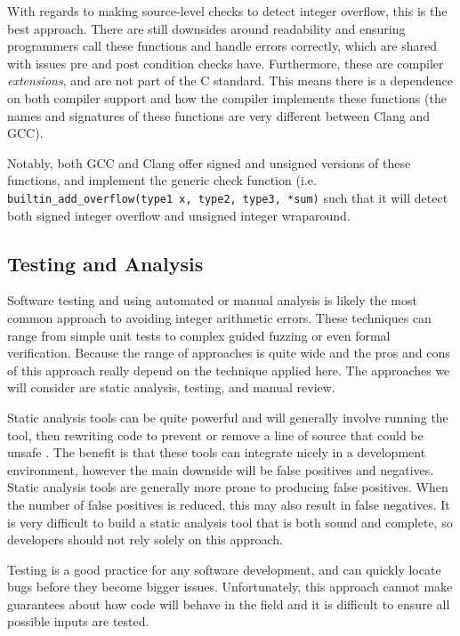 With regards to making source-level checks to detect integer overflow, this is the best approach. There are still downsides around readability and ensuring programmers call these functions and handle errors correctly, which are shared with issues pre and post condition checks have. Furthermore, these are compiler \textit{extensions}, and are not part of the C standard. This means there is a dependence on both compiler support and how the compiler implements these functions (the names and signatures of these functions are very different between Clang and GCC).

Notably, both GCC and Clang offer signed and unsigned versions of these functions, and implement the generic check function (i.e. \texttt{builtin\_add\_overflow(type1 x, type2, type3, *sum)} such that it will detect both signed integer overflow and unsigned integer wraparound.

\subsection{Testing and Analysis}

Software testing and using automated or manual analysis is likely the most common approach to avoiding integer arithmetic errors. These techniques can range from simple unit tests to complex guided fuzzing or even formal verification. Because the range of approaches is quite wide and the pros and cons of this approach really depend on the technique applied here. The approaches we will consider are static analysis, testing, and manual review.

Static analysis tools can be quite powerful and will generally involve running the tool, then rewriting code to prevent or remove a line of source that could be unsafe \cite{secure_coding}. The benefit is that these tools can integrate nicely in a development environment, however the main downside will be false positives and negatives. Static analysis tools are generally more prone to producing false positives. When the number of false positives is reduced, this may also result in false negatives. It is very difficult to build a static analysis tool that is both sound and complete, so developers should not rely solely on this approach.

Testing is a good practice for any software development, and can quickly locate bugs before they become bigger issues. Unfortunately, this approach cannot make guarantees about how code will behave in the field and it is difficult to ensure all possible inputs are tested.

